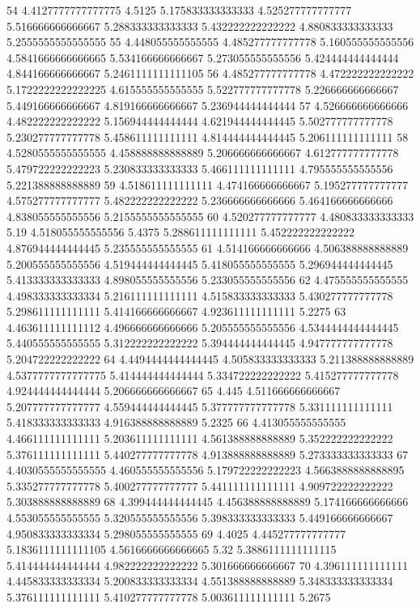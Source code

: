 54 4.4127777777777775 4.5125 5.175833333333333 4.525277777777777 5.516666666666667 5.288333333333333 5.432222222222222 4.880833333333333 5.2555555555555555
55 4.448055555555555 4.485277777777778 5.160555555555556 4.5841666666666665 5.534166666666667 5.273055555555556 5.424444444444444 4.844166666666667 5.2461111111111105
56 4.485277777777778 4.472222222222222 5.1722222222222225 4.615555555555555 5.522777777777778 5.226666666666667 5.449166666666667 4.819166666666667 5.236944444444444
57 4.526666666666666 4.482222222222222 5.156944444444444 4.621944444444445 5.502777777777778 5.230277777777778 5.458611111111111 4.814444444444445 5.206111111111111
58 4.5280555555555555 4.458888888888889 5.206666666666667 4.612777777777778 5.479722222222223 5.230833333333333 5.466111111111111 4.795555555555556 5.221388888888889
59 4.518611111111111 4.474166666666667 5.195277777777777 4.575277777777777 5.482222222222222 5.236666666666666 5.464166666666666 4.838055555555556 5.2155555555555555
60 4.520277777777777 4.480833333333333 5.19 4.518055555555556 5.4375 5.288611111111111 5.452222222222222 4.876944444444445 5.235555555555555
61 4.514166666666666 4.506388888888889 5.200555555555556 4.519444444444445 5.418055555555555 5.296944444444445 5.413333333333333 4.898055555555556 5.233055555555556
62 4.475555555555555 4.498333333333334 5.216111111111111 4.515833333333333 5.430277777777778 5.298611111111111 5.414166666666667 4.923611111111111 5.2275
63 4.463611111111112 4.496666666666666 5.205555555555556 4.5344444444444445 5.440555555555555 5.312222222222222 5.394444444444445 4.947777777777778 5.204722222222222
64 4.4494444444444445 4.505833333333333 5.211388888888889 4.5377777777777775 5.414444444444444 5.334722222222222 5.415277777777778 4.924444444444444 5.206666666666667
65 4.445 4.511666666666667 5.207777777777777 4.559444444444445 5.377777777777778 5.331111111111111 5.418333333333333 4.916388888888889 5.2325
66 4.413055555555555 4.466111111111111 5.203611111111111 4.561388888888889 5.352222222222222 5.376111111111111 5.440277777777778 4.913888888888889 5.273333333333333
67 4.4030555555555555 4.460555555555556 5.179722222222223 4.5663888888888895 5.335277777777778 5.400277777777777 5.441111111111111 4.909722222222222 5.303888888888889
68 4.399444444444445 4.456388888888889 5.174166666666666 4.553055555555555 5.320555555555556 5.398333333333333 5.449166666666667 4.950833333333334 5.298055555555555
69 4.4025 4.445277777777777 5.1836111111111105 4.5616666666666665 5.32 5.3886111111111115 5.414444444444444 4.982222222222222 5.301666666666667
70 4.396111111111111 4.445833333333334 5.200833333333334 4.551388888888889 5.348333333333334 5.376111111111111 5.410277777777778 5.003611111111111 5.2675

